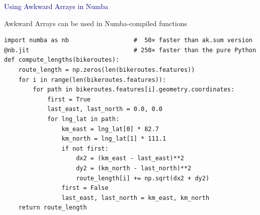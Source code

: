 \documentclass[aspectratio=169]{beamer}
\begin{document}
\begin{frame}{}
\Huge
\vspace{1 cm}
\begin{center}
\textcolor{darkblue}{Using Awkward Arrays in Numba}
\end{center}
\end{frame}

\begin{frame}[fragile]{Awkward Arrays can be used in Numba-compiled functions}
\vspace{0.1 cm}
\small
\begin{verbatim}
import numba as nb                  #  50× faster than ak.sum version
@nb.jit                             # 250× faster than the pure Python
def compute_lengths(bikeroutes):
    route_length = np.zeros(len(bikeroutes.features))
    for i in range(len(bikeroutes.features)):
        for path in bikeroutes.features[i].geometry.coordinates:
            first = True
            last_east, last_north = 0.0, 0.0
            for lng_lat in path:
                km_east = lng_lat[0] * 82.7
                km_north = lng_lat[1] * 111.1
                if not first:
                    dx2 = (km_east - last_east)**2
                    dy2 = (km_north - last_north)**2
                    route_length[i] += np.sqrt(dx2 + dy2)
                first = False
                last_east, last_north = km_east, km_north
    return route_length
\end{verbatim}
\end{frame}
\end{document}
